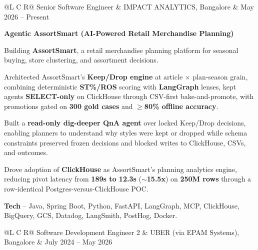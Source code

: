 
\noindent
\begin{tabularx}{\textwidth}{@{}L C R@{}}
\textcolor{role}{Senior Software Engineer} & \textcolor{company}{IMPACT ANALYTICS, Bangalore} & \textcolor{date}{May 2026 -- Present}\\
\end{tabularx}
\vspace{-2ex}

\textcolor{Project}{\textbf{Agentic AssortSmart (AI-Powered Retail Merchandise Planning)}}
\vspace{-1ex}
\begin{zitemize}
    \item Building \textbf{AssortSmart}, a retail merchandise planning platform for seasonal buying, store clustering, and assortment decisions.
    \item Architected AssortSmart's \textbf{Keep/Drop engine} at article $\times$ plan-season grain, combining deterministic \textbf{ST\%/ROS} scoring with \textbf{LangGraph} lenses, kept agents \textbf{SELECT-only} on ClickHouse through CSV-first bake-and-promote, with promotions gated on \textbf{300 gold cases} and $\geq$\textbf{80\% offline accuracy}.
    \item Built a \textbf{read-only dig-deeper QnA agent} over locked Keep/Drop decisions, enabling planners to understand why styles were kept or dropped while schema constraints preserved frozen decisions and blocked writes to ClickHouse, CSVs, and outcomes.
    \item Drove adoption of \textbf{ClickHouse} as AssortSmart's planning analytics engine, reducing pivot latency from \textbf{189s to 12.3s} ($\sim$\textbf{15.5x}) on \textbf{250M rows} through a row-identical Postgres-versus-ClickHouse POC.
    \item \textbf{Tech} -- Java, Spring Boot, Python, FastAPI, LangGraph, MCP, ClickHouse, BigQuery, GCS, Datadog, LangSmith, PostHog, Docker.
\end{zitemize}

\vspace{0.5ex}
\noindent
\begin{tabularx}{\textwidth}{@{}L C R@{}}
\textcolor{role}{Software Development Engineer 2} & \textcolor{company}{UBER (via EPAM Systems), Bangalore} & \textcolor{date}{July 2024 -- May 2026}\\
\end{tabularx}
\vspace{-2ex}

